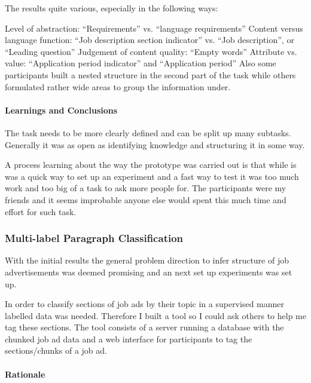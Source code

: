 The results quite various, especially in the following ways:

Level of abstraction: “Requirements” vs. “language requirements”
Content versus language function: “Job description section indicator” vs. “Job description”, or “Leading question”
Judgement of content quality: “Empty words”
Attribute vs. value: “Application period indicator” and “Application period”
Also some participants built a nested structure in the second part of the task while others formulated rather wide areas to group the information under.

\paragraph{Learnings and Conclusions}
\label{par:Learnings and Conclusions}

The task needs to be more clearly defined and can be split up many subtasks. Generally it was as open as identifying knowledge and structuring it in some way.

A process learning about the way the prototype was carried out is that while is was a quick way to set up an experiment and a fast way to test it was too much work and too big of a task to ask more people for. The participants were my friends and it seems improbable anyone else would spent this much time and effort for such task.




\subsubsection{Multi-label Paragraph Classification}
\label{subs:Multi-label Paragraph Classification}

With the initial results the general problem direction to infer structure of job advertisements was deemed promising and an next set up experiments was set up.

In order to classify sections of job ads by their topic in a supervised manner labelled data was needed. Therefore I built a tool so I could ask others to help me tag these sections. The tool consists of a server running a database with the chunked job ad data and a web interface for participants to tag the sections/chunks of a job ad.

\paragraph{Rationale}
\label{par:Rationale}

